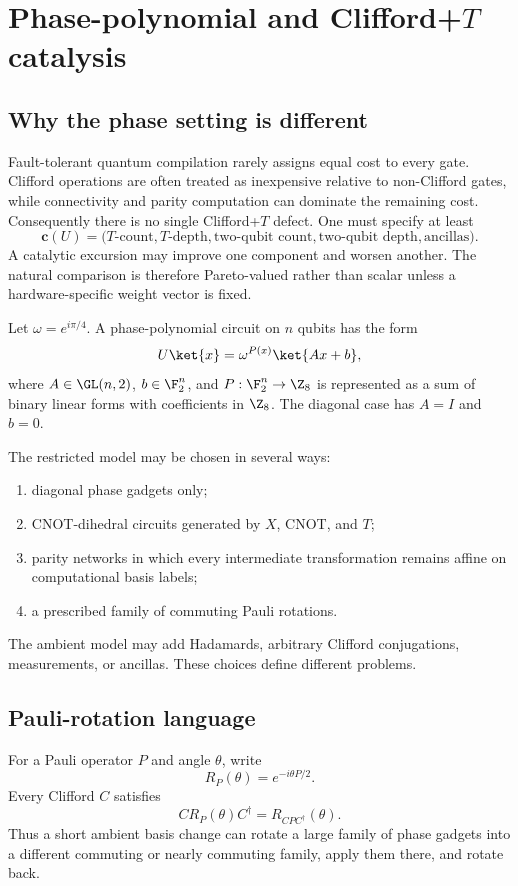 \chapter{Phase-polynomial and Clifford+\texorpdfstring{$T$}{T} catalysis}\label{ch:phase-cliffordt}


\section{Why the phase setting is different}
Fault-tolerant quantum compilation rarely assigns equal cost to every gate.  Clifford operations are often treated as inexpensive relative to non-Clifford gates, while connectivity and parity computation can dominate the remaining cost.  Consequently there is no single Clifford+$T$ defect.  One must specify at least
\[
\mathbf c(U)=
\bigl(
T\text{-count},
T\text{-depth},
\text{two-qubit count},
\text{two-qubit depth},
\text{ancillas}
\bigr).
\]
A catalytic excursion may improve one component and worsen another.  The natural comparison is therefore Pareto-valued rather than scalar unless a hardware-specific weight vector is fixed.

Let $\omega=e^{i\pi/4}$.  A phase-polynomial circuit on $n$ qubits has the form \cite{AmyMosca2019,Selinger2013}
\begin{equation}\label{eq:phase-poly-normal}
U\ket{x}=\omega^{P(x)}\ket{Ax+b},
\end{equation}
where $A\in\GL(n,2)$, $b\in\F_2^n$, and $P:\F_2^n\to\Z_8$ is represented as a sum of binary linear forms with coefficients in $\Z_8$.  The diagonal case has $A=I$ and $b=0$.

The restricted model may be chosen in several ways:
\begin{enumerate}
\item diagonal phase gadgets only;
\item CNOT-dihedral circuits generated by $X$, CNOT, and $T$;
\item parity networks in which every intermediate transformation remains affine on computational basis labels;
\item a prescribed family of commuting Pauli rotations.
\end{enumerate}
The ambient model may add Hadamards, arbitrary Clifford conjugations, measurements, or ancillas.  These choices define different problems.

\section{Pauli-rotation language}
For a Pauli operator $P$ and angle $\theta$, write
\[
R_P(\theta)=e^{-i\theta P/2}.
\]
Every Clifford $C$ satisfies
\begin{equation}\label{eq:pauli-conjugation}
C R_P(\theta) C^\dagger=R_{CPC^\dagger}(\theta).
\end{equation}
Thus a short ambient basis change can rotate a large family of phase gadgets into a different commuting or nearly commuting family, apply them there, and rotate back.


